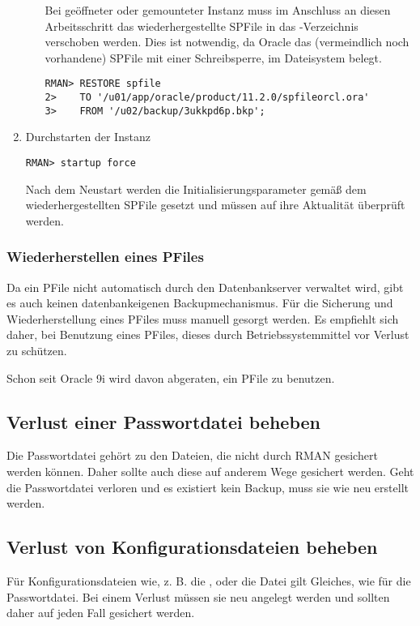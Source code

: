 \begin{enumerate}
\begin{itemize}
								Bei ge\"offneter oder gemounteter Instanz muss im Anschluss an diesen Arbeitsschritt das wiederhergestellte SPFile in das -Verzeichnis verschoben werden. Dies ist notwendig, da Oracle das (vermeindlich noch vorhandene) SPFile mit einer Schreibsperre, im Dateisystem belegt.
								\begin{lstlisting}[caption={Wiederherstellen des SPFiles in der MOUNT-Phase},label=admin1427,language=rman]
RMAN> RESTORE spfile
2>    TO '/u01/app/oracle/product/11.2.0/spfileorcl.ora'
3>    FROM '/u02/backup/3ukkpd6p.bkp';
                  \end{lstlisting}
              \end{itemize}
            \item Durchstarten der Instanz
              \begin{lstlisting}[caption={Neustart der Instanz},label=admin1428,language=rman,alsolanguage=sqlplus]
RMAN> startup force
              \end{lstlisting}
              Nach dem Neustart werden die Initialisierungsparameter gem\"a\ss{} dem wiederhergestellten SPFile gesetzt und m\"ussen auf ihre Aktualit\"at \"uberpr\"uft werden.
            \end{enumerate}
        \subsubsection{Wiederherstellen eines PFiles}
          Da ein PFile nicht automatisch durch den Datenbankserver verwaltet wird, gibt es auch keinen datenbankeigenen Backupmechanismus. F\"ur die Sicherung und Wiederherstellung eines PFiles muss manuell gesorgt werden. Es empfiehlt sich daher, bei Benutzung eines PFiles, dieses durch Betriebssystemmittel vor Verlust zu sch\"utzen.
          \begin{merke}
            Schon seit Oracle 9i wird davon abgeraten, ein PFile zu benutzen.
          \end{merke}
      \subsection{Verlust einer Passwortdatei beheben}
        Die Passwortdatei geh\"ort zu den Dateien, die nicht durch RMAN gesichert werden k\"onnen. Daher sollte auch diese auf anderem Wege gesichert werden. Geht die Passwortdatei verloren und es existiert kein Backup, muss sie wie neu erstellt werden.
      \subsection{Verlust von Konfigurationsdateien beheben}
        F\"ur Konfigurationsdateien wie, z. B. die ,  oder die Datei  gilt Gleiches, wie f\"ur die Passwortdatei. Bei einem Verlust m\"ussen sie neu angelegt werden und sollten daher auf jeden Fall gesichert werden.

